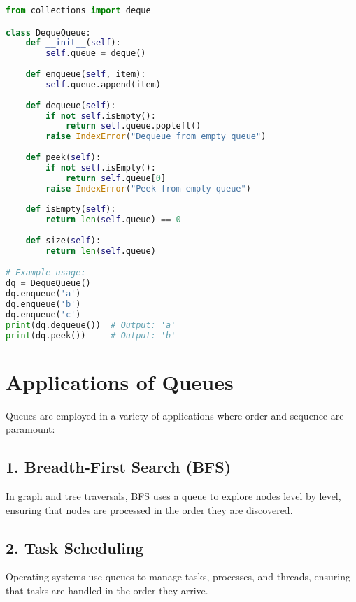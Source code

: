 \begin{fullwidth}
\begin{lstlisting}[language=Python]
from collections import deque

class DequeQueue:
    def __init__(self):
        self.queue = deque()
    
    def enqueue(self, item):
        self.queue.append(item)
    
    def dequeue(self):
        if not self.isEmpty():
            return self.queue.popleft()
        raise IndexError("Dequeue from empty queue")
    
    def peek(self):
        if not self.isEmpty():
            return self.queue[0]
        raise IndexError("Peek from empty queue")
    
    def isEmpty(self):
        return len(self.queue) == 0
    
    def size(self):
        return len(self.queue)

# Example usage:
dq = DequeQueue()
dq.enqueue('a')
dq.enqueue('b')
dq.enqueue('c')
print(dq.dequeue())  # Output: 'a'
print(dq.peek())     # Output: 'b'
\end{lstlisting}
\end{fullwidth}

\section{Applications of Queues}

Queues are employed in a variety of applications where order and sequence are paramount:

\subsection*{1. Breadth-First Search (BFS)}
In graph and tree traversals, BFS uses a queue to explore nodes level by level, ensuring that nodes are processed in the order they are discovered.

\subsection*{2. Task Scheduling}
Operating systems use queues to manage tasks, processes, and threads, ensuring that tasks are handled in the order they arrive.

